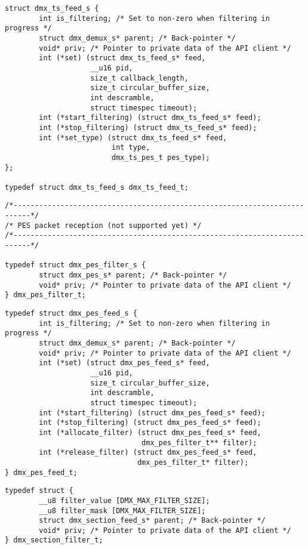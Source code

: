 \begin{verbatim}
struct dmx_ts_feed_s { 
        int is_filtering; /* Set to non-zero when filtering in progress */
        struct dmx_demux_s* parent; /* Back-pointer */
        void* priv; /* Pointer to private data of the API client */ 
        int (*set) (struct dmx_ts_feed_s* feed, 
                    __u16 pid,
                    size_t callback_length, 
                    size_t circular_buffer_size, 
                    int descramble, 
                    struct timespec timeout); 
        int (*start_filtering) (struct dmx_ts_feed_s* feed); 
        int (*stop_filtering) (struct dmx_ts_feed_s* feed); 
        int (*set_type) (struct dmx_ts_feed_s* feed, 
                         int type, 
                         dmx_ts_pes_t pes_type);
};

typedef struct dmx_ts_feed_s dmx_ts_feed_t; 
\end{verbatim}

\begin{verbatim}
/*--------------------------------------------------------------------------*/ 
/* PES packet reception (not supported yet) */
/*--------------------------------------------------------------------------*/ 

typedef struct dmx_pes_filter_s {
        struct dmx_pes_s* parent; /* Back-pointer */ 
        void* priv; /* Pointer to private data of the API client */ 
} dmx_pes_filter_t; 
\end{verbatim}

\begin{verbatim}
typedef struct dmx_pes_feed_s {
        int is_filtering; /* Set to non-zero when filtering in progress */
        struct dmx_demux_s* parent; /* Back-pointer */
        void* priv; /* Pointer to private data of the API client */ 
        int (*set) (struct dmx_pes_feed_s* feed, 
                    __u16 pid,
                    size_t circular_buffer_size, 
                    int descramble, 
                    struct timespec timeout); 
        int (*start_filtering) (struct dmx_pes_feed_s* feed); 
        int (*stop_filtering) (struct dmx_pes_feed_s* feed); 
        int (*allocate_filter) (struct dmx_pes_feed_s* feed, 
                                dmx_pes_filter_t** filter); 
        int (*release_filter) (struct dmx_pes_feed_s* feed, 
                               dmx_pes_filter_t* filter); 
} dmx_pes_feed_t; 
\end{verbatim}


\label{sectionfilter}
\begin{verbatim}
typedef struct { 
        __u8 filter_value [DMX_MAX_FILTER_SIZE]; 
        __u8 filter_mask [DMX_MAX_FILTER_SIZE]; 
        struct dmx_section_feed_s* parent; /* Back-pointer */ 
        void* priv; /* Pointer to private data of the API client */ 
} dmx_section_filter_t;
\end{verbatim}

